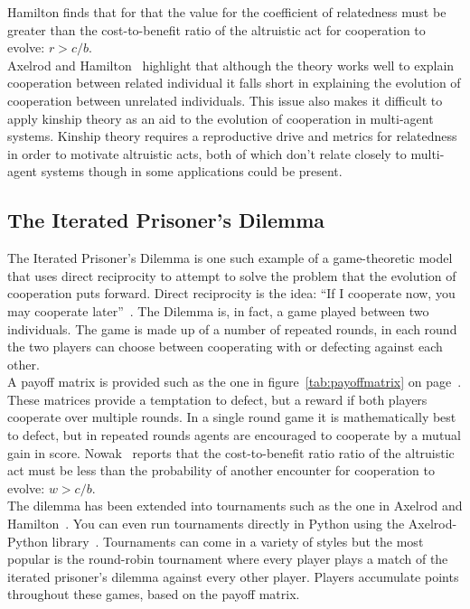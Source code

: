 \documentclass[twoside,twocolumn]{article}
\begin{document}
Hamilton finds that for that the value for the coefficient of relatedness must be greater than the cost-to-benefit ratio of the altruistic act for cooperation to evolve: $r>c/b$.\\
Axelrod and Hamilton~\cite{evolution_of_cooperation} highlight that although the theory works well to explain cooperation between related individual it falls short in explaining the evolution of cooperation between unrelated individuals. This issue also makes it difficult to apply kinship theory as an aid to the evolution of cooperation in multi-agent systems. Kinship theory requires a reproductive drive and metrics for relatedness in order to motivate altruistic acts, both of which don't relate closely to multi-agent systems though in some applications could be present.

\subsection{The Iterated Prisoner's Dilemma}
The Iterated Prisoner's Dilemma is one such example of a game-theoretic model that uses direct reciprocity to attempt to solve the problem that the evolution of cooperation puts forward. Direct reciprocity is the idea: ``If I cooperate now, you may cooperate later''~\cite{five_rules_coop}. The Dilemma is, in fact, a game played between two individuals. The game is made up of a number of repeated rounds, in each round the two players can choose between cooperating with or defecting against each other.\\
A payoff matrix is provided such as the one in figure~\ref{tab:payoffmatrix} on page~\pageref{tab:payoffmatrix}. These matrices provide a temptation to defect, but a reward if both players cooperate over multiple rounds. In a single round game it is mathematically best to defect, but in repeated rounds agents are encouraged to cooperate by a mutual gain in score. Nowak~\cite{five_rules_coop} reports that the cost-to-benefit ratio ratio of the altruistic act must be less than the probability of another encounter for cooperation to evolve: $w>c/b$.\\
The dilemma has been extended into tournaments such as the one in Axelrod and Hamilton~\cite{evolution_of_cooperation}. You can even run tournaments directly in Python using the Axelrod-Python library~\cite{axelrodproject}. Tournaments can come in a variety of styles but the most popular is the round-robin tournament where every player plays a match of the iterated prisoner's dilemma against every other player. Players accumulate points throughout these games, based on the payoff matrix.\\
\end{document}
